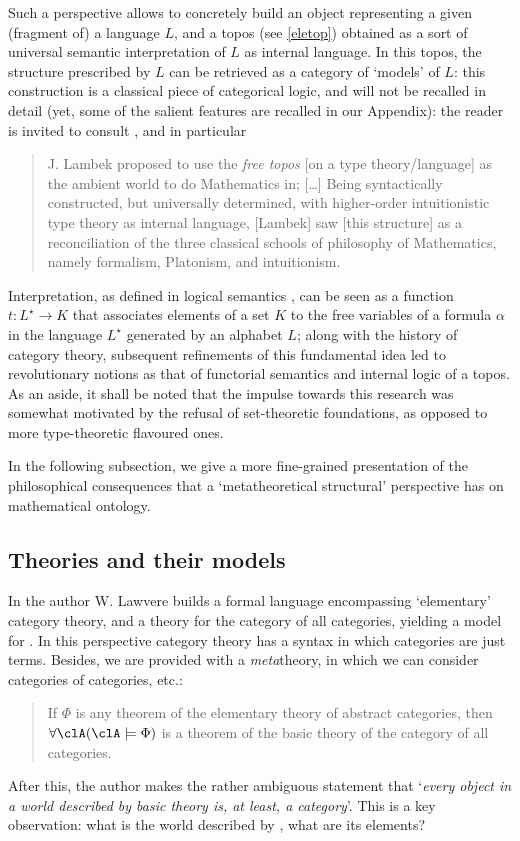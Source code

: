 Such a perspective allows to concretely build an object representing a given (fragment of) a language $L$, and a topos (see \autoref{eletop}) obtained as a sort of universal semantic interpretation of $L$ as internal language. In this topos, the structure prescribed by $L$ can be retrieved as a category of `models' of $L$: this construction is a classical piece of categorical logic, and will not be recalled in detail (yet, some of the salient features are recalled in our Appendix): the reader is invited to consult \cite[II.12, 13, 14]{lambek1988introduction}, and in particular
\begin{quote}
    J. Lambek proposed to use the \emph{free topos} [on a type theory/language] as the ambient world to do Mathematics in; [\dots\unkern] Being syntactically constructed, but universally determined, with higher-order intuitionistic type theory as internal language, [Lambek] saw [this structure] as a reconciliation of the three classical schools of philosophy of Mathematics, namely formalism, Platonism, and intuitionism. \hfill\cite{free_topos}
\end{quote}
Interpretation, as defined in logical semantics \cite{gamut1991logic}, can be seen as a function $t: L^\star \to K$ that associates elements of a set $K$ to the free variables of a formula $\alpha$ in the language $L^\star$ generated by an alphabet $L$; along with the history of category theory, subsequent refinements of this fundamental idea led to revolutionary notions as that of functorial semantics and internal logic of a topos.
As an aside, it shall be noted that the impulse towards this research was somewhat motivated by the refusal of set-theoretic foundations, as opposed to more type-theoretic flavoured ones.

In the following subsection, we give a more fine-grained presentation of the philosophical consequences that a `metatheoretical structural' perspective has on mathematical ontology.
\subsection{Theories and their models}
In \cite{lajolla} the author W. Lawvere builds a formal language  encompassing `elementary' category theory, and a theory  for the category of all categories, yielding a model for . In this perspective category theory has a syntax in which categories are just terms. Besides, we are provided with a \emph{meta}theory, in which we can consider categories of categories, etc.:
\begin{quote}
    If $\Phi$ is any theorem of the elementary theory of abstract categories, then $\forall \clA (\clA \models \Phi)$ is a theorem of the basic theory of the category of all categories. \hfill \cite{lajolla}
\end{quote}
After this, the author makes the rather ambiguous statement that `\textit{every object in a world described by basic theory is, at least, a category}'. This is a key observation: what is the world described by , what are its elements?

